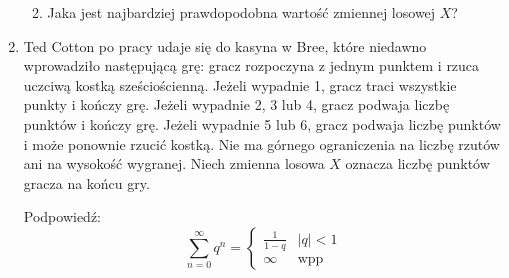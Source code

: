\documentclass[twoside]{mwart}
\newcommand{\ans}[1]{}
\newcommand{\ans}[1]{\par\emph{Odpowiedź:} #1}
\begin{document}
\begin{enumerate}
\begin{enumerate}
{}
\item Jaka jest najbardziej prawdopodobna wartość zmiennej losowej $X$?
\ans{2}
\end{enumerate}
\item Ted Cotton po pracy udaje się do kasyna w Bree, które niedawno wprowadziło następującą grę: gracz rozpoczyna z jednym punktem i rzuca uczciwą kostką sześciościenną.
Jeżeli wypadnie 1, gracz traci wszystkie punkty i kończy grę.
Jeżeli wypadnie 2, 3 lub 4, gracz podwaja liczbę punktów i kończy grę.
Jeżeli wypadnie 5 lub 6, gracz podwaja liczbę punktów i może ponownie rzucić kostką.
Nie ma górnego ograniczenia na liczbę rzutów ani na wysokość wygranej.
Niech zmienna losowa $X$ oznacza liczbę punktów gracza na końcu gry.

Podpowiedź: \[
\sum_{n=0}^\infty q^n = 
\begin{cases} 
	\frac{1}{1-q} & \left|q\right|<1 \\
	\infty & \text{wpp}
\end{cases}
\]


\end{enumerate}
\end{document}
